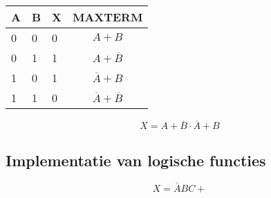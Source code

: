 \documentclass[11pt, a4paper]{article}
\begin{document}
\begin{tabular}{l l l || c}
A & B & X & MAXTERM \\
\hline
0 & 0 & 0 & $A+B$ \\
0 & 1 & 1 & $A+\overline{B}$ \\
1 & 0 & 1 & $\overline{A}+B $\\
1 & 1 & 0 & $\overline{A}+\overline{B}$ \\
\end{tabular}

$$X = A+\overline{B} \cdot \overline{A}+B $$



\subsection{Implementatie van logische functies}

$$ X = \overline{A}BC + $$

\newpage
\end{document}
